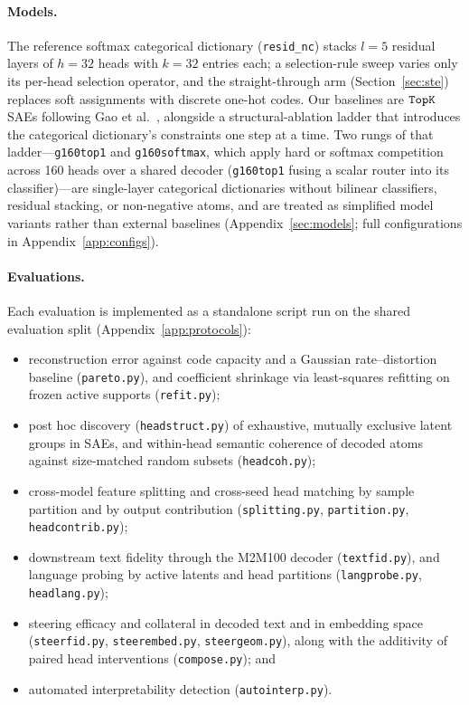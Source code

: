 \documentclass[11pt]{article}
\begin{document}
\paragraph{Models.}
The reference softmax categorical dictionary (\texttt{resid\_nc}) stacks
$l{=}5$ residual layers of $h{=}32$ heads with $k{=}32$ entries each; a
selection-rule sweep varies only its per-head selection operator, and the
straight-through arm (Section~\ref{sec:ste}) replaces soft assignments
with discrete one-hot codes. Our baselines are $\mathop{\mathtt{TopK}}\limits$ SAEs following
Gao et al.~\cite{gao2024}, alongside a structural-ablation ladder that
introduces the categorical dictionary's constraints one step at a time.
Two rungs of that ladder---\texttt{g160top1} and \texttt{g160softmax},
which apply hard or softmax competition across 160 heads over a shared
decoder (\texttt{g160top1} fusing a scalar router into its
classifier)---are single-layer categorical dictionaries without bilinear
classifiers, residual stacking, or non-negative atoms, and are treated as
simplified model variants rather than external baselines
(Appendix~\ref{sec:models}; full configurations in
Appendix~\ref{app:configs}).

\paragraph{Evaluations.}
Each evaluation is implemented as a standalone script run on the shared
evaluation split (Appendix~\ref{app:protocols}):
\begin{itemize}
\item reconstruction error against code capacity and a Gaussian
rate--distortion baseline (\texttt{pareto.py}), and coefficient shrinkage
via least-squares refitting on frozen active supports (\texttt{refit.py});
\item post hoc discovery (\texttt{headstruct.py}) of exhaustive, mutually
exclusive latent groups in SAEs, and within-head semantic coherence of
decoded atoms against size-matched random subsets (\texttt{headcoh.py});
\item cross-model feature splitting and cross-seed head matching by sample
partition and by output contribution (\texttt{splitting.py},
\texttt{partition.py}, \texttt{headcontrib.py});
\item downstream text fidelity through the M2M100 decoder
(\texttt{textfid.py}), and language probing by active latents and head
partitions (\texttt{langprobe.py}, \texttt{headlang.py});
\item steering efficacy and collateral in decoded text and in embedding
space (\texttt{steerfid.py}, \texttt{steerembed.py},
\texttt{steergeom.py}), along with the additivity of paired head interventions
(\texttt{compose.py}); and
\item automated interpretability detection (\texttt{autointerp.py}).
\end{itemize}
\end{document}
